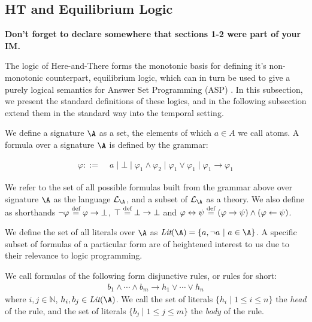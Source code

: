 \subsection{HT and Equilibrium Logic}

\textbf{Don't forget to declare somewhere that sections 1-2 were part
  of your IM.}

The logic of Here-and-There forms the monotonic basis for defining
it's non-monotonic counterpart, equilibrium logic, which can in turn
be used to give a purely logical semantics for Answer Set Programming
(ASP) \cite{pearce06a}. In this subsection, we present the standard
definitions of these logics, and in the following subsection extend
them in the standard way into the temporal setting.

We define a signature $\A$ as a set, the elements of which $a\in A$ we
call atoms. A formula over a signature $\A$ is defined by the grammar:

\begin{align*}
    \varphi ::= &\; a \mid \bot \mid
                  \varphi_1 \wedge \varphi_2 \mid
                  \varphi_1 \vee \varphi_1 \mid
                  \varphi_1 \to \varphi_1
\end{align*}

We refer to the set of all possible formulas built from the grammar
above over signature $\A$ as the language $\langa$, and a
subset of $\langa$ as a theory.  We also define as shorthands
$\neg \varphi \stackrel{\text{def}}{=} \varphi \to \bot$, $\top \stackrel{\text{def}}{=} \bot \to \bot$
and
$\varphi \leftrightarrow \psi \stackrel{\text{def}}{=} (\varphi \rightarrow \psi) \wedge
(\varphi \leftarrow \psi)$.

We define the set of all literals over $\A$ as
$\textit{Lit}(\A) = \{ a, \lnot a\ |\ a \in \A \}$.  A specific subset
of formulas of a particular form are of heightened interest to us due
to their relevance to logic programming.

\begin{definition}
    We call formulas of the following form disjunctive rules, or rules for short:
\begin{align*}
  b_{1} \wedge \cdots \wedge b_{m} \rightarrow h_1 \vee \cdots \vee h_{n}
\end{align*}
where $i,j \in \mathbb{N}$, $h_{i}, b_{j} \in \textit{Lit}(\A)$. We
call the set of literals $\{ h_i \mid 1 \leq i \leq n \}$ the
\emph{head} of the rule, and the set of literals
$\{ b_j \mid 1 \leq j \leq m \}$ the \emph{body} of the rule.
\end{definition}

